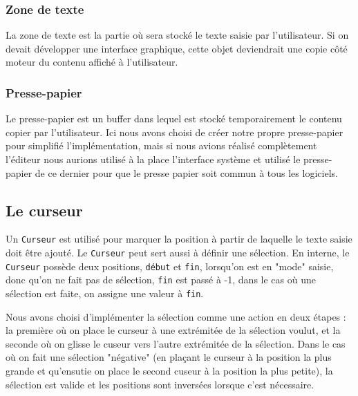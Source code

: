 \documentclass[french]{article}
\begin{document}
\subsubsection{Zone de texte}

La zone de texte est la partie où sera stocké le texte saisie par l'utilisateur. Si on devait développer une interface graphique, cette objet deviendrait une copie côté moteur du contenu affiché à l'utilisateur.

\subsubsection{Presse-papier}

Le presse-papier est un buffer dans lequel est stocké temporairement le contenu copier par l'utilisateur. Ici nous avons choisi de créer notre propre presse-papier pour simplifié l'implémentation, mais si nous avions réalisé complètement l'éditeur nous aurions utilisé à la place l'interface système et utilisé le presse-papier de ce dernier pour que le presse papier soit commun à tous les logiciels.

\subsection{Le curseur}\label{ssec:curseur}
Un \texttt{Curseur} est utilisé pour marquer la position à partir de laquelle le texte saisie doit être ajouté. Le \texttt{Curseur} peut sert aussi à définir une sélection. En interne, le \texttt{Curseur} possède deux positions, \texttt{début} et \texttt{fin}, lorsqu'on est en "mode" saisie, donc qu'on ne fait pas de sélection, \texttt{fin} est passé à -1, dans le cas où une sélection est faite, on assigne une valeur à \texttt{fin}.

Nous avons choisi d'implémenter la sélection comme une action en deux étapes : la première où on place le curseur à une extrémitée de la sélection voulut, et la seconde où on glisse le cuseur vers l'autre extrémitée de la sélection. Dans le cas où on fait une sélection "négative" (en plaçant le curseur à la position la plus grande et qu'ensutie on place le second cuseur à la position la plus petite), la sélection est valide et les positions sont inversées lorsque c'est nécessaire.
\end{document}
